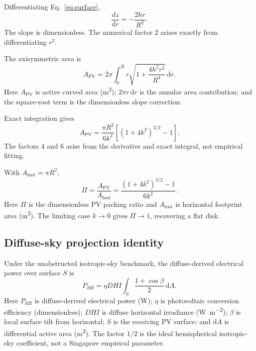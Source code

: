 \documentclass[11pt,a4paper]{article}
\begin{document}
Differentiating Eq.~\eqref{eq:surface},
\begin{equation}
\frac{\mathrm dz}{\mathrm dr}=-\frac{2hr}{R^2}.
\end{equation}
The slope is dimensionless. The numerical factor 2 arises exactly from differentiating $r^2$.

The axisymmetric area is
\begin{equation}
A_{\mathrm{PV}}=2\pi\int_0^Rr\sqrt{1+\frac{4h^2r^2}{R^4}}\,\mathrm dr.
\end{equation}
Here $A_{\mathrm{PV}}$ is active curved area (\si{\square\metre}); $2\pi r\,\mathrm dr$ is the annular area contribution; and the square-root term is the dimensionless slope correction.

Exact integration gives
\begin{equation}
A_{\mathrm{PV}}=\frac{\pi R^2}{6k^2}\left[(1+4k^2)^{3/2}-1\right].
\end{equation}
The factors 4 and 6 arise from the derivative and exact integral, not empirical fitting.

With $A_{\mathrm{foot}}=\pi R^2$,
\begin{equation}
\boxed{\Pi=\frac{A_{\mathrm{PV}}}{A_{\mathrm{foot}}}=\frac{(1+4k^2)^{3/2}-1}{6k^2}}.
\label{eq:packing-paraboloid}
\end{equation}
Here $\Pi$ is the dimensionless PV packing ratio and $A_{\mathrm{foot}}$ is horizontal footprint area (\si{\square\metre}). The limiting case $k\to0$ gives $\Pi\to1$, recovering a flat disk.

\subsection{Diffuse-sky projection identity}
Under the unobstructed isotropic-sky benchmark, the diffuse-derived electrical power over surface \(S\) is
\begin{equation}
P_{\mathrm{diff}}
=
\eta DHI
\int_S
\frac{1+\cos\beta}{2}\,\mathrm dA.
\label{eq:diffuse-integrated}
\end{equation}
Here \(P_{\mathrm{diff}}\) is diffuse-derived electrical power (W); \(\eta\) is photovoltaic conversion efficiency (dimensionless); \(DHI\) is diffuse horizontal irradiance (\si{\watt\per\square\metre}); \(\beta\) is local surface tilt from horizontal; \(S\) is the receiving PV surface; and \(\mathrm dA\) is differential active area (\si{\square\metre}). The factor \(1/2\) is the ideal hemispherical isotropic-sky coefficient, not a Singapore empirical parameter.
\end{document}
